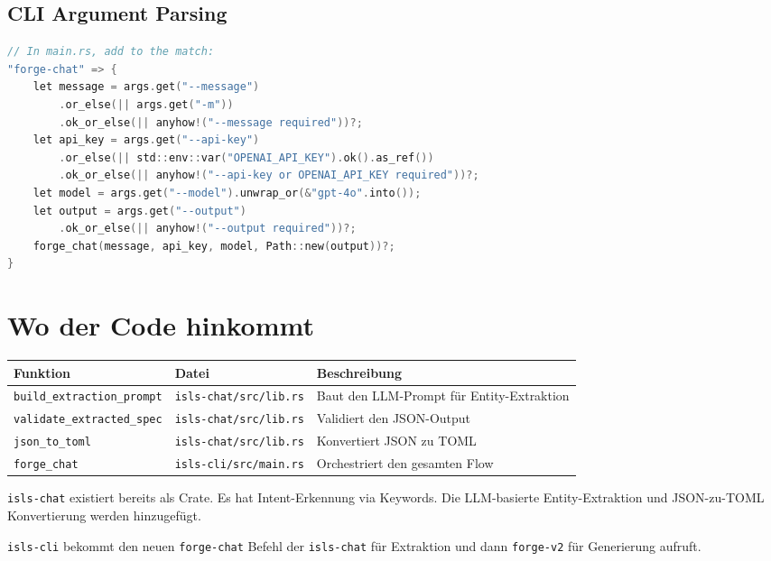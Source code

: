 \documentclass[11pt,a4paper]{article}
\begin{document}
\subsection{CLI Argument Parsing}

\begin{lstlisting}[language=C]
// In main.rs, add to the match:
"forge-chat" => {
    let message = args.get("--message")
        .or_else(|| args.get("-m"))
        .ok_or_else(|| anyhow!("--message required"))?;
    let api_key = args.get("--api-key")
        .or_else(|| std::env::var("OPENAI_API_KEY").ok().as_ref())
        .ok_or_else(|| anyhow!("--api-key or OPENAI_API_KEY required"))?;
    let model = args.get("--model").unwrap_or(&"gpt-4o".into());
    let output = args.get("--output")
        .ok_or_else(|| anyhow!("--output required"))?;
    forge_chat(message, api_key, model, Path::new(output))?;
}
\end{lstlisting}

\section{Wo der Code hinkommt}

\begin{center}
\small
\begin{tabular}{l l p{7cm}}
\toprule
\textbf{Funktion} & \textbf{Datei} & \textbf{Beschreibung} \\
\midrule
\texttt{build\_extraction\_prompt} & \texttt{isls-chat/src/lib.rs} & Baut den LLM-Prompt f\"ur Entity-Extraktion \\
\texttt{validate\_extracted\_spec} & \texttt{isls-chat/src/lib.rs} & Validiert den JSON-Output \\
\texttt{json\_to\_toml} & \texttt{isls-chat/src/lib.rs} & Konvertiert JSON zu TOML \\
\texttt{forge\_chat} & \texttt{isls-cli/src/main.rs} & Orchestriert den gesamten Flow \\
\bottomrule
\end{tabular}
\end{center}

\texttt{isls-chat} existiert bereits als Crate. Es hat Intent-Erkennung
via Keywords. Die LLM-basierte Entity-Extraktion und JSON-zu-TOML
Konvertierung werden hinzugef\"ugt.

\texttt{isls-cli} bekommt den neuen \texttt{forge-chat} Befehl der
\texttt{isls-chat} f\"ur Extraktion und dann \texttt{forge-v2} f\"ur
Generierung aufruft.
\end{document}
